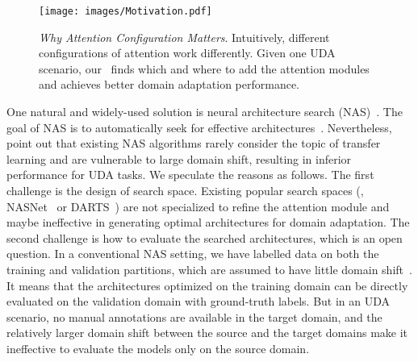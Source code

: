 \documentclass[10pt,twocolumn,letterpaper]{article}
\begin{document}
\begin{figure}
    \centering
    \texttt{[image: images/Motivation.pdf]}
    \caption{\textit{Why Attention Configuration Matters}. Intuitively, different configurations of attention work differently.
    Given one UDA scenario, our \iMethod\, finds which and where to add the attention modules and achieves better domain adaptation performance. }
    \label{fig:Motivation}
    \vspace{-4mm}
\end{figure} 
One natural and widely-used solution is neural architecture search (NAS)~\cite{liu2018DARTS,zoph2018NASNet,real2019EvoNAS,guo2020SPOS}. The goal of NAS is to automatically seek for effective architectures~\cite{zoph2018NASNet,li2020adapting}.
Nevertheless, \cite{elsken2019NASASurvey,li2020adapting} point out that existing NAS algorithms rarely consider the topic of transfer learning and are vulnerable to large domain shift, resulting in inferior performance for UDA tasks.
We speculate the reasons as follows.
The first challenge is the design of search space. Existing popular search spaces (\eg, NASNet~\cite{zoph2018NASNet} or DARTS~\cite{liu2018DARTS}) are not specialized to refine the attention module and maybe ineffective in generating optimal architectures for domain adaptation.
The second challenge is how to evaluate the searched architectures, which is an open question. In a conventional NAS setting, we have labelled data on both the training and validation partitions, which are assumed to have little domain shift~\cite{quionero2009dataset}. It means that the architectures optimized on the training domain can be directly evaluated on the validation domain with ground-truth labels. But in an UDA scenario, no manual annotations are available in the target domain, and the relatively larger domain shift between the source and the target domains make it ineffective to evaluate the models only on the source domain. 
\end{document}
